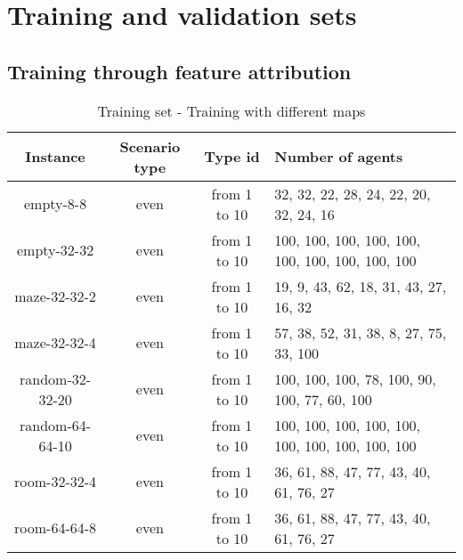\appendix
\section{Training and validation sets}
\label{ap:sets}

\subsection{Training through feature attribution}

\begin{table}[!ht]
    \centering
    \caption{Training set - Training with different maps}
    \begin{tabular}{|c|c|c|p{6cm}|}
        \hline
        Instance & Scenario type & Type id & Number of agents \\
        \hline
        empty-8-8 & even & from 1 to 10 & 32, 32, 22, 28, 24, 22, 20, 32, 24, 16 \\
        \hline
        empty-32-32 & even & from 1 to 10 & 100, 100, 100, 100, 100, 100, 100, 100, 100, 100 \\
        \hline
        maze-32-32-2 & even & from 1 to 10 & 19, 9, 43, 62, 18, 31, 43, 27, 16, 32 \\
        \hline
        maze-32-32-4 & even & from 1 to 10 & 57, 38, 52, 31, 38, 8, 27, 75, 33, 100 \\
        \hline
        random-32-32-20 & even & from 1 to 10 & 100, 100, 100, 78, 100, 90, 100, 77, 60, 100 \\
        \hline
        random-64-64-10 & even & from 1 to 10 & 100, 100, 100, 100, 100, 100, 100, 100, 100, 100 \\
        \hline
        room-32-32-4 & even & from 1 to 10 & 36, 61, 88, 47, 77, 43, 40, 61, 76, 27 \\
        \hline
        room-64-64-8 & even & from 1 to 10 & 36, 61, 88, 47, 77, 43, 40, 61, 76, 27 \\
        \hline
    \end{tabular}
    \label{tab:train-set-features}
\end{table}

